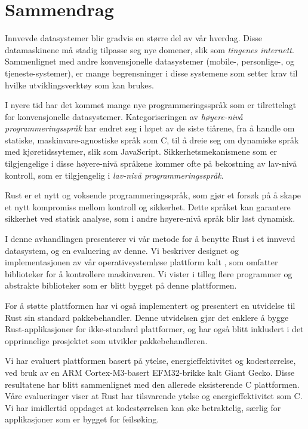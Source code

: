 
\chapter{Sammendrag}
\label{chap:sammendrag}

Innvevde datasystemer blir gradvis en større del av vår hverdag.
Disse datamaskinene må stadig tilpasse seg nye domener, slik som \emph{tingenes internett}.
Sammenlignet med andre konvensjonelle datasystemer (mobile-, personlige-, og tjeneste-systemer), er mange begrensninger i disse systemene som setter krav til hvilke utviklingsverktøy som kan brukes.

I nyere tid har det kommet mange nye programmeringsspråk som er tilrettelagt for konvensjonelle datasystemer.
Kategoriseringen av \emph{høyere-nivå programmeringsspråk} har endret seg i løpet av de siste tiårene, fra å handle om statiske, maskinvare-agnostiske språk som C, til å dreie seg om dynamiske språk med kjøretidssytemer, slik som JavaScript.
Sikkerhetsmekanismene som er tilgjengelige i disse høyere-nivå språkene kommer ofte på bekostning av lav-nivå kontroll, som er tilgjengelig i \emph{lav-nivå programmeringsspråk}.

Rust er et nytt og voksende programmeringsspråk, som gjør et forsøk på å skape et nytt kompromiss mellom kontroll og sikkerhet.
Dette språket kan garantere sikkerhet ved statisk analyse, som i andre høyere-nivå språk blir løst dynamisk.

I denne avhandlingen presenterer vi vår metode for å benytte Rust i et innvevd datasystem, og en evaluering av denne.
Vi beskriver designet og implementasjonen av vår operativsystemløse plattform kalt {\rg}, som omfatter biblioteker for å kontrollere maskinvaren.
Vi vister i tilleg flere programmer og abstrakte biblioteker som er blitt bygget på denne plattformen.

For å støtte plattformen har vi også implementert og presentert en utvidelse til Rust sin standard pakkebehandler.
Denne utvidelsen gjør det enklere å bygge Rust-applikasjoner for ikke-standard plattformer, og har også blitt inkludert i det opprinnelige prosjektet som utvikler pakkebehandleren.

Vi har evaluert plattformen basert på ytelse, energieffektivitet og kodestørrelse, ved bruk av en ARM Cortex-M3-basert EFM32-brikke kalt Giant Gecko.
Disse resultatene har blitt sammenlignet med den allerede eksisterende C plattformen.
Våre evalueringer viser at Rust har tilsvarende ytelse og energieffektivitet som C.
Vi har imidlertid oppdaget at kodestørrelsen kan øke betraktelig, særlig for applikasjoner som er bygget for feilsøking.
